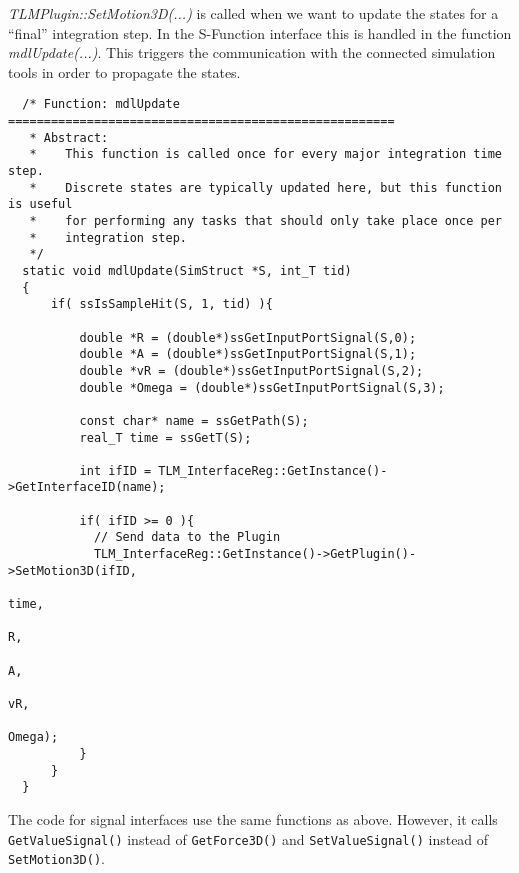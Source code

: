 {\em TLMPlugin::SetMotion3D(...)} is called when we want to update the states for a ``final'' integration step. In the S-Function interface this is handled in the function {\em mdlUpdate(...)}. 
This triggers the communication with the connected simulation tools in order to propagate the states.

{\scriptsize
\begin{verbatim}
  /* Function: mdlUpdate ======================================================
   * Abstract:
   *    This function is called once for every major integration time step.
   *    Discrete states are typically updated here, but this function is useful
   *    for performing any tasks that should only take place once per
   *    integration step.
   */
  static void mdlUpdate(SimStruct *S, int_T tid)
  {
      if( ssIsSampleHit(S, 1, tid) ){

          double *R = (double*)ssGetInputPortSignal(S,0);
          double *A = (double*)ssGetInputPortSignal(S,1);
          double *vR = (double*)ssGetInputPortSignal(S,2);
          double *Omega = (double*)ssGetInputPortSignal(S,3);

          const char* name = ssGetPath(S);
          real_T time = ssGetT(S);

          int ifID = TLM_InterfaceReg::GetInstance()->GetInterfaceID(name);

          if( ifID >= 0 ){
            // Send data to the Plugin
            TLM_InterfaceReg::GetInstance()->GetPlugin()->SetMotion3D(ifID,
                                                                      time,
                                                                      R,
                                                                      A,
                                                                      vR,
                                                                      Omega);
          }
      }
  }
\end{verbatim}
} 

The code for signal interfaces use the same functions as above.
However, it calls \texttt{GetValueSignal()} instead of \texttt{GetForce3D()} and \texttt{SetValueSignal()} instead of \texttt{SetMotion3D()}.
